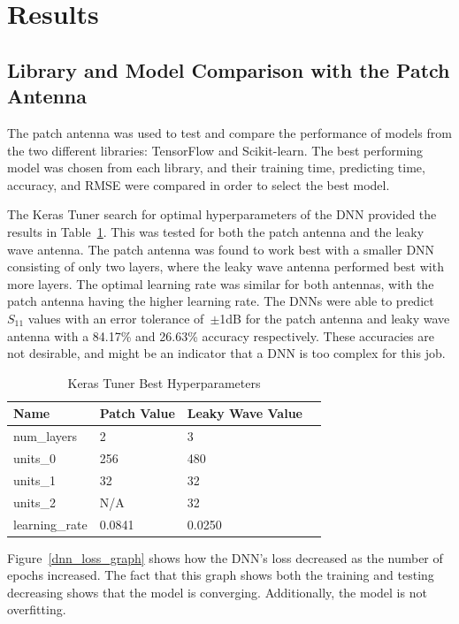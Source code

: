 \documentclass[lettersize,journal]{IEEEtran}
\begin{document}
\section{Results}
\subsection{Library and Model Comparison with the Patch Antenna}
The patch antenna was used to test and compare the performance of models from the two different libraries: TensorFlow and Scikit-learn. The best performing model was chosen from each library, and their training time, predicting time, accuracy, and RMSE were compared in order to select the best model.

The Keras Tuner search for optimal hyperparameters of the DNN provided the results in Table~\ref{keras_best_params}. This was tested for both the patch antenna and the leaky wave antenna. The patch antenna was found to work best with a smaller DNN consisting of only two layers, where the leaky wave antenna performed best with more layers. The optimal learning rate was similar for both antennas, with the patch antenna having the higher learning rate. The DNNs were able to predict $S_{11}$ values with an error tolerance of~$\pm$1dB for the patch antenna and leaky wave antenna with a 84.17\% and 26.63\% accuracy respectively. These accuracies are not desirable, and might be an indicator that a DNN is too complex for this job.

\begin{table}[h]
\caption{Keras Tuner Best Hyperparameters}
\begin{center}
\begin{tabular}{ |l|l|l|l| }
    \hline
    Name & Patch Value & Leaky Wave Value \\ 
    \hline
    num\_layers & 2 & 3 \\  
    \hline
    units\_0 & 256 & 480 \\
    \hline
    units\_1 & 32 & 32 \\
    \hline
    units\_2 & N/A & 32 \\
    \hline
    learning\_rate & 0.0841 & 0.0250 \\
    \hline
\end{tabular}
\end{center}
\label{keras_best_params}
\end{table}

Figure~\ref{dnn_loss_graph} shows how the DNN's loss decreased as the number of epochs increased. The fact that this graph shows both the training and testing decreasing shows that the model is converging. Additionally, the model is not overfitting. 
\end{document}
